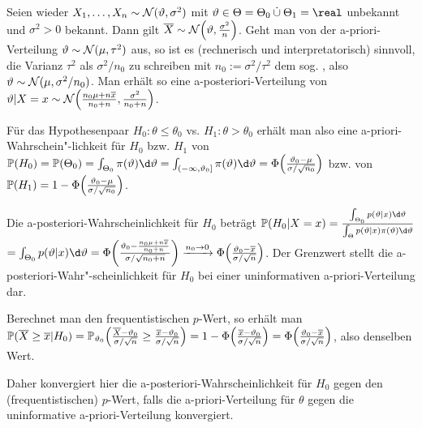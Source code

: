 \begin{Bsp}
    Seien wieder $X_1, \dotsc, X_n \sim \mathcal{N}(\vartheta, \sigma^2)$ mit
    $\theta \in \Theta = \Theta_0 \mathbin{\dot{\cup}} \Theta_1 = \real$ unbekannt und
    $\sigma^2 > 0$ bekannt.
    Dann gilt $\overline{X} \sim \mathcal{N}\!\left(\vartheta, \frac{\sigma^2}{n}\right)$.
    Geht man von der a-priori-Verteilung $\vartheta \sim \mathcal{N}(\mu, \tau^2)$ aus, so ist es
    (rechnerisch und interpretatorisch) sinnvoll,
    die Varianz $\tau^2$ als $\sigma^2/n_0$ zu schreiben mit
    $n_0 := \sigma^2/\tau^2$
    dem sog. , also $\vartheta \sim \mathcal{N}(\mu, \sigma^2/n_0)$.
    Man erhält so eine a-posteriori-Verteilung von
    $\vartheta|X=x \sim \mathcal{N}\!\left(\frac{n_0 \mu + n\overline{x}}{n_0 + n},
    \frac{\sigma^2}{n_0+n}\right)$.
    
    Für das Hypothesenpaar $H_0\colon \theta \le \theta_0$ vs. $H_1\colon \theta > \theta_0$
    erhält man also eine a-priori-Wahrschein"-lichkeit für $H_0$ bzw. $H_1$ von
    $\PP(H_0) = \PP(\Theta_0) = \int_{\Theta_0} \pi(\theta)\d\theta
    = \int_{(-\infty, \theta_0]} \pi(\theta)\d\theta =
    \Phi\!\left(\frac{\theta_0 - \mu}{\sigma/\sqrt{n_0}}\right)$ bzw. von
    $\mathbb{P}(H_1) = 1 - \Phi\!\left(\frac{\vartheta_0 - \mu}{\sigma/\sqrt{n_0}}\right)$.
    
    Die a-posteriori-Wahrscheinlichkeit für $H_0$ beträgt
    $\PP(H_0|X=x) = \frac{\int_{\Theta_0} p(\theta|x)\d\theta}
    {\int_\Theta p(\theta|x)\pi(\theta)\d\theta}$\\
    $= \int_{\Theta_0} p(\theta|x)\d\theta
    = \Phi\!\left(\frac{\theta_0 - \frac{n_0 \mu + n\overline{x}}{n_0 + n}}
    {\sigma/\sqrt{n_0+n}}\right)
    \xrightarrow{n_0 \to 0} \Phi\!\left(\frac{\theta_0 - \overline{x}}{\sigma/\sqrt{n}}\right)$.
    Der Grenzwert stellt die a-posteriori-Wahr"-scheinlichkeit für $H_0$ bei einer uninformativen
    a-priori-Verteilung dar.
    
    Berechnet man den frequentistischen $p$-Wert, so erhält man\\
    $\mathbb{P}(\overline{X} \ge \overline{x}|H_0) =
    \mathbb{P}_{\vartheta_0}\!\left(\frac{\overline{X} - \vartheta_0}{\sigma/\sqrt{n}} \ge
    \frac{\overline{x} - \vartheta_0}{\sigma/\sqrt{n}}\right)
    = 1 - \Phi\!\left(\frac{\overline{x} - \vartheta_0}{\sigma/\sqrt{n}}\right)
    = \Phi\!\left(\frac{\vartheta_0 - \overline{x}}{\sigma/\sqrt{n}}\right)$,
    also denselben Wert.
    
    Daher konvergiert hier die a-posteriori-Wahrscheinlichkeit für $H_0$ gegen den
    (frequentistischen) $p$-Wert, falls die a-priori-Verteilung für $\theta$ gegen die
    uninformative a-priori-Verteilung konvergiert.
\end{Bsp}


